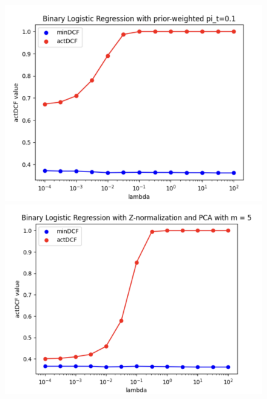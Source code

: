 \documentclass{article}
\begin{document}
\begin{figure}[H]
\begin{minipage}{.27\textwidth}
            \includegraphics[width=\linewidth]{./img/LLR_W3.png}
        \end{minipage}
        \begin{minipage}{.27\textwidth}
            \centering
            \includegraphics[width=\linewidth]{./img/LLR_Z2.png}
        \end{minipage}
        \begin{minipage}{.27\textwidth}
            \centering

\end{minipage}
\end{figure}
\end{document}
